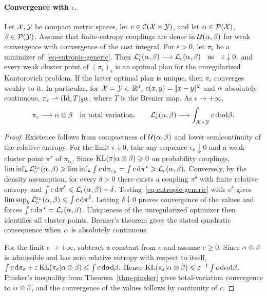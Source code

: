 \paragraph{Convergence with \texorpdfstring{$\epsilon$}{epsilon}.}
\begin{prop}\label{prop-continuous-convergence-epsilon}
Let $\mathcal{X},\mathcal{Y}$ be compact metric spaces, let $c\in\mathcal{C}(\mathcal{X}\times\mathcal{Y})$, and let $\alpha\in\mathcal{P}(\mathcal{X})$, $\beta\in\mathcal{P}(\mathcal{Y})$. Assume that finite-entropy couplings are dense in $\mathcal{U}(\alpha,\beta)$ for weak convergence with convergence of the cost integral. For $\epsilon>0$, let $\pi_\epsilon$ be a minimizer of~\eqref{eq-entropic-generic}. Then
\(\mathcal{L}_c^\varepsilon(\alpha,\beta)\longrightarrow \mathcal{L}_c(\alpha,\beta) \quad\text{as}\quad \varepsilon\downarrow0,\)
and every weak cluster point of $(\pi_\epsilon)_\epsilon$ is an optimal plan for the unregularized Kantorovich problem. If the latter optimal plan is unique, then $\pi_\epsilon$ converges weakly to it. In particular, for $\mathcal{X}=\mathcal{Y}\subset\mathbb{R}^d$, $c(x,y)=|\!| x-y |\!|^2$ and $\alpha$ absolutely continuous, $\pi_\varepsilon\rightharpoonup(\mathrm{Id},T)_\sharp\alpha$, where $T$ is the Brenier map.
As $\epsilon\to+\infty$,
\[
\pi_\varepsilon\longrightarrow \alpha\otimes\beta
\quad\text{in total variation},\qquad
\mathcal{L}_c^\varepsilon(\alpha,\beta)\longrightarrow \int_{\mathcal{X}\times\mathcal{Y}} c\,\mathrm{d}\alpha\mathrm{d}\beta.
\]
\end{prop}
\begin{proof}
Existence follows from compactness of $\mathcal{U}(\alpha,\beta)$ and lower semicontinuity of the relative entropy. For the limit $\epsilon\downarrow0$, take any sequence $\epsilon_k\downarrow0$ and a weak cluster point $\pi^\star$ of $\pi_{\epsilon_k}$. Since $\operatorname{KL}(\pi|\alpha\otimes\beta)\geqslant0$ on probability couplings,
\(\liminf_k \mathcal{L}_c^{\varepsilon_k}(\alpha,\beta) \geqslant \liminf_k \int c\,\mathrm{d}\pi_{\varepsilon_k} = \int c\,\mathrm{d}\pi^\star \geqslant \mathcal{L}_c(\alpha,\beta).\)
Conversely, by the density assumption, for every $\delta>0$ there exists a coupling $\pi^\delta$ with finite relative entropy and $\int c\,\mathrm{d}\pi^\delta\leqslant \mathcal{L}_c(\alpha,\beta)+\delta$. Testing~\eqref{eq-entropic-generic} with $\pi^\delta$ gives
\(\limsup_k \mathcal{L}_c^{\varepsilon_k}(\alpha,\beta) \leqslant \int c\,\mathrm{d}\pi^\delta.\)
Letting $\delta\downarrow0$ proves convergence of the values and forces $\int c\,\mathrm{d}\pi^\star=\mathcal{L}_c(\alpha,\beta)$. Uniqueness of the unregularized optimizer then identifies all cluster points. Brenier's theorem gives the stated quadratic consequence when $\alpha$ is absolutely continuous.

For the limit $\epsilon\to+\infty$, subtract a constant from $c$ and assume $c\geq0$. Since $\alpha\otimes\beta$ is admissible and has zero relative entropy with respect to itself,
\(\int c\,\mathrm{d}\pi_\varepsilon+\varepsilon\operatorname{KL}(\pi_\varepsilon|\alpha\otimes\beta) \leqslant \int c\,\mathrm{d}\alpha\mathrm{d}\beta.\)
Hence $\operatorname{KL}(\pi_\varepsilon|\alpha\otimes\beta)\leqslant \varepsilon^{-1}\int c\,\mathrm{d}\alpha\mathrm{d}\beta$. Pinsker's inequality from Theorem~\ref{thm-pinsker} gives total-variation convergence to $\alpha\otimes\beta$, and the convergence of the values follows by continuity of $c$.
\end{proof}
